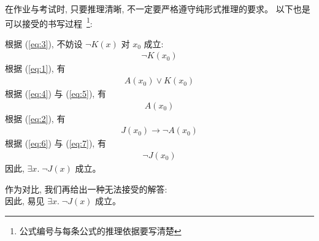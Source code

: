 \documentclass[a4paper, justified]{tufte-handout}
\begin{document}
\begin{solution}

  在作业与考试时, 只要推理清晰, 不一定要严格遵守纯形式推理的要求。
  以下也是可以接受的书写过程~\footnote{公式编号与每条公式的推理依据要写清楚}:

  \setcounter{equation}{3}
  \noindent 根据 (\ref{eq:3}), 不妨设 $\lnot K(x)$ 对 $x_{0}$ 成立:
  \begin{align}
    \lnot K(x_{0}) \label{eq:4}
  \end{align}
  根据 (\ref{eq:1}), 有
  \begin{align}
    A(x_{0}) \lor K(x_{0}) \label{eq:5}
  \end{align}
  根据 (\ref{eq:4}) 与 (\ref{eq:5}), 有
  \begin{align}
    A(x_{0}) \label{eq:6}
  \end{align}
  根据 (\ref{eq:2}), 有
  \begin{align}
    J(x_{0}) \to \lnot A(x_{0}) \label{eq:7}
  \end{align}
  根据 (\ref{eq:6}) 与 (\ref{eq:7}), 有
  \begin{align}
    \lnot J(x_{0}) \label{eq:8}
  \end{align}
  因此, $\exists x.\; \lnot J(x)$ 成立。

  作为对比, 我们再给出一种无法接受的解答: \\
  \lipsum[1]
  因此, 易见 $\exists x.\; \lnot J(x)$ 成立。
\end{solution}
\end{document}
